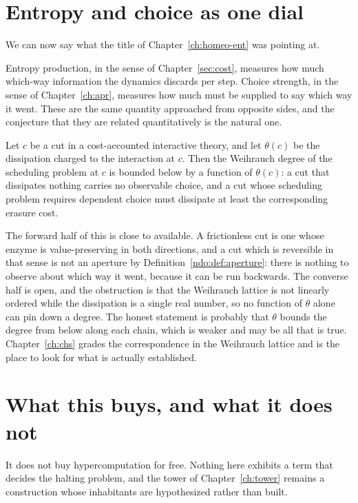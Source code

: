 \section{Entropy and choice as one dial}

We can now say what the title of Chapter~\ref{ch:homeo-ent} was pointing
at.

Entropy production, in the sense of Chapter~\ref{sec:cost}, measures how
much which-way information the dynamics discards per step.
Choice strength, in the sense of Chapter~\ref{ch:apr}, measures how much
must be supplied to say which way it went.
These are the same quantity approached from opposite sides, and the
conjecture that they are related quantitatively is the natural one.

\begin{conjecture}
\label{conj:dissipation-choice}
Let $c$ be a cut in a cost-accounted interactive theory, and let
$\theta(c)$ be the dissipation charged to the interaction at $c$.
Then the Weihrauch degree of the scheduling problem at $c$ is bounded
below by a function of $\theta(c)$: a cut that dissipates nothing carries
no observable choice, and a cut whose scheduling problem requires
dependent choice must dissipate at least the corresponding erasure cost.
\end{conjecture}

The forward half of this is close to available.
A frictionless cut is one whose enzyme is value-preserving in both
directions, and a cut which is reversible in that sense is not an
aperture by Definition~\ref{ndo:def:aperture}: there is nothing to
observe about which way it went, because it can be run backwards.
The converse half is open, and the obstruction is that the Weihrauch
lattice is not linearly ordered while the dissipation is a single real
number, so no function of $\theta$ alone can pin down a degree.
The honest statement is probably that $\theta$ bounds the degree from
below along each chain, which is weaker and may be all that is true.
Chapter~\ref{ch:chs} grades the correspondence in the Weihrauch lattice
and is the place to look for what is actually established.

\section{What this buys, and what it does not}

It does not buy hypercomputation for free.
Nothing here exhibits a term that decides the halting problem, and the
tower of Chapter~\ref{ch:tower} remains a construction whose inhabitants
are hypothesized rather than built.

